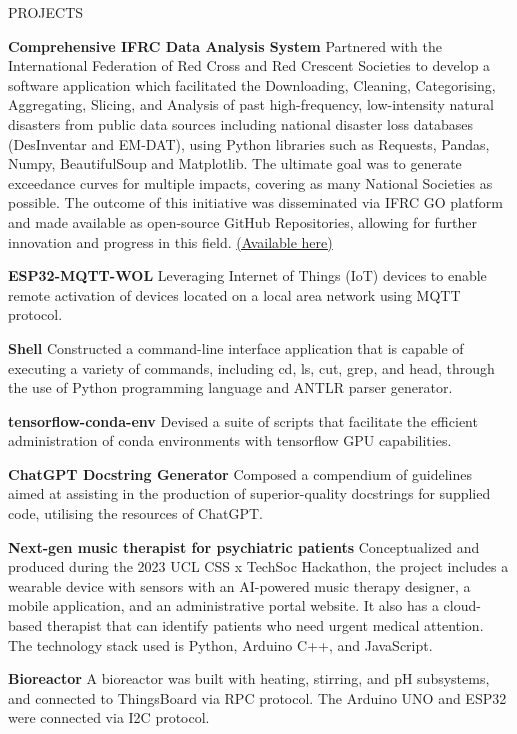 \documentclass{resume} %
\begin{document}
\begin{rSection}{PROJECTS}
\vspace{-1.25em}
\item \textbf{Comprehensive IFRC Data Analysis System} {Partnered with the International Federation of Red Cross and Red Crescent Societies to develop a software application which facilitated the Downloading, Cleaning, Categorising, Aggregating, Slicing, and Analysis of past high-frequency, low-intensity natural disasters from public data sources including national disaster loss databases (DesInventar and EM-DAT), using Python libraries such as Requests, Pandas, Numpy, BeautifulSoup and Matplotlib. The ultimate goal was to generate exceedance curves for multiple impacts, covering as many National Societies as possible. The outcome of this initiative was disseminated via IFRC GO platform and made available as open-source GitHub Repositories, allowing for further innovation and progress in this field. \href{https://students.cs.ucl.ac.uk/2022/group5/index.html}{(Available here)}}
\item \textbf{ESP32-MQTT-WOL} {Leveraging Internet of Things (IoT) devices to enable remote activation of devices located on a local area network using MQTT protocol.}
\item \textbf{Shell} {Constructed a command-line interface application that is capable of executing a variety of commands, including cd, ls, cut, grep, and head, through the use of Python programming language and ANTLR parser generator.}
\item \textbf{tensorflow-conda-env} {Devised a suite of scripts that facilitate the efficient administration of conda environments with tensorflow GPU capabilities.}
\item \textbf{ChatGPT Docstring Generator} {Composed a compendium of guidelines aimed at assisting in the production of superior-quality docstrings for supplied code, utilising the resources of ChatGPT.}
\item \textbf{Next-gen music therapist for psychiatric patients} {Conceptualized and produced during the 2023 UCL CSS x TechSoc Hackathon, the project includes a wearable device with sensors with an AI-powered music therapy designer, a mobile application, and an administrative portal website. It also has a cloud-based therapist that can identify patients who need urgent medical attention. The technology stack used is Python, Arduino C++, and JavaScript.}
\item \textbf{Bioreactor} {A bioreactor was built with heating, stirring, and pH subsystems, and connected to ThingsBoard via RPC protocol. The Arduino UNO and ESP32 were connected via I2C protocol.}
\end{rSection} 
\end{document}
